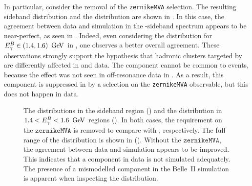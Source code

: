 In particular, consider the removal of the \texttt{zernikeMVA} selection.
The resulting \EB sideband distribution and the \Mbc distribution are shown in .
In this case, the agreement between data and simulation in the \EB-sideband spectrum appears to be near-perfect, as seen in .
Indeed, even considering the \Mbc distribution for ${E^B_{\gamma}}\in(1.4,1.6)~\mathrm{\,Ge\kern -0.1em V}$ in , one observes a better overall agreement.
These observations strongly support the hypothesis that hadronic clusters targeted by \ZMVA are differently affected in \MC and data.
The component cannot be common to \epem\ra\qqbar events, because the effect was not seen in off-resonance data in .
As a result, this component is suppressed in \MC by a selection on the \texttt{zernikeMVA} observable, but this does not happen in data.
\begin{figure}[hbtp!]
    \caption{\label{fig:nozmva_test}   The \EB distributions in the \EB sideband region ()
    and the \Mbc distribution in $1.4<{E^B_{\gamma}}<1.6~\mathrm{\,Ge\kern -0.1em V}$ regions ().
    In both cases, the requirement on the $\mathtt{zernikeMVA}$ is removed 
    to compare with , respectively.
    The full range of the \ZMVA distribution is shown in ().
    Without the $\mathtt{zernikeMVA}$, the agreement between data and simulation appears to be improved.
    This indicates that a component in data is not simulated adequately.
    The presence of a mismodelled component in the Belle~II simulation is apparent when inspecting the \ZMVA distribution.
    }
\end{figure}

